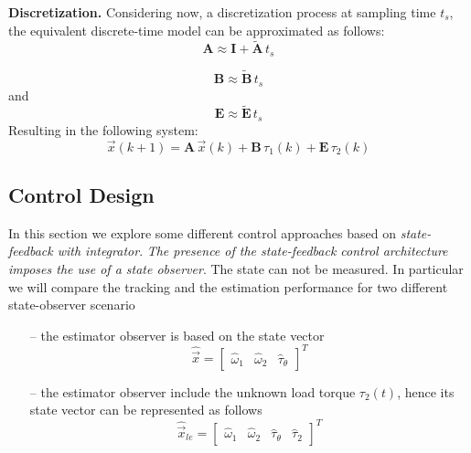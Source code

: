 \documentclass[11pt,a4paper,oneside]{book}
\numberwithin{equation}{section}
\theoremstyle{it}
\theoremstyle{definition}
\begin{document}
\textbf{Discretization.} Considering now, a discretization process at sampling time $t_s$, the equivalent 
discrete-time model can be approximated as follows:
\begin{equation}
	\mathbf{A} \approx \mathbf{I} + \tilde{\mathbf{A}}\,t_s
\end{equation}

\begin{equation}
	\mathbf{B} \approx \tilde{\mathbf{B}} \,t_s
\end{equation}
and
\begin{equation}
	\mathbf{E} \approx \tilde{\mathbf{E}} \,t_s
\end{equation}
Resulting in the following system:
\begin{equation}
	\vec{x}(k+1)  = \mathbf{A} \,\vec{x}(k) +\mathbf{B} \,\tau_1(k)+\mathbf{E} 
	\,\tau_2(k)
\end{equation}


\subsection{Control Design} 
In this section we explore some different control approaches based on 
\textit{state-feedback with integrator}. \textit{The presence of the 
	state-feedback control architecture imposes the use of a state observer}. The 
state can not be measured. In particular we will compare the tracking and the 
estimation performance for two different state-observer scenario
\begin{itemize}
	\item[--] the estimator observer is based on the state vector \begin{equation}
		\hat{\vec{x}} = \left[\begin{matrix}\hat{ \omega}_1&\hat{\omega}_2&\hat{\tau}_{\theta} 
		\end{matrix} \right]^T
	\end{equation}
	\item[--] the estimator observer include the unknown load torque $\tau_2(t)$, hence its state vector can be represented as follows \begin{equation}
		\hat{\vec{x}}_{le} = \left[\begin{matrix}\hat{ \omega}_1&\hat{\omega}_2&\hat{\tau}_{\theta}&\hat{\tau}_{2} 
		\end{matrix} \right]^T
	\end{equation}
\end{itemize}
\end{document}
